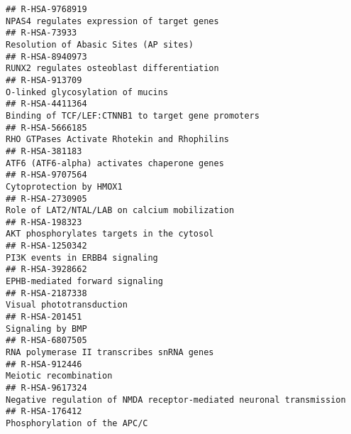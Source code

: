 \documentclass[
]{article}
\begin{document}
\begin{verbatim}
## R-HSA-9768919                                                                                           NPAS4 regulates expression of target genes
## R-HSA-73933                                                                                                  Resolution of Abasic Sites (AP sites)
## R-HSA-8940973                                                                                           RUNX2 regulates osteoblast differentiation
## R-HSA-913709                                                                                                      O-linked glycosylation of mucins
## R-HSA-4411364                                                                                   Binding of TCF/LEF:CTNNB1 to target gene promoters
## R-HSA-5666185                                                                                         RHO GTPases Activate Rhotekin and Rhophilins
## R-HSA-381183                                                                                           ATF6 (ATF6-alpha) activates chaperone genes
## R-HSA-9707564                                                                                                              Cytoprotection by HMOX1
## R-HSA-2730905                                                                                        Role of LAT2/NTAL/LAB on calcium mobilization
## R-HSA-198323                                                                                             AKT phosphorylates targets in the cytosol
## R-HSA-1250342                                                                                                       PI3K events in ERBB4 signaling
## R-HSA-3928662                                                                                                      EPHB-mediated forward signaling
## R-HSA-2187338                                                                                                             Visual phototransduction
## R-HSA-201451                                                                                                                      Signaling by BMP
## R-HSA-6807505                                                                                            RNA polymerase II transcribes snRNA genes
## R-HSA-912446                                                                                                                 Meiotic recombination
## R-HSA-9617324                                                                  Negative regulation of NMDA receptor-mediated neuronal transmission
## R-HSA-176412                                                                                                          Phosphorylation of the APC/C

\end{verbatim}
\end{document}
